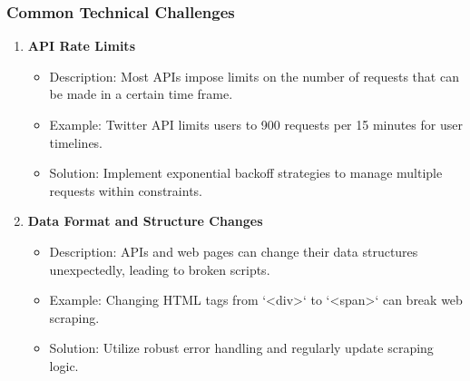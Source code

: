\documentclass{beamer}
\begin{document}
\begin{frame}[fragile]
    \frametitle{Common Technical Challenges}
    \begin{enumerate}
        \item \textbf{API Rate Limits}
        \begin{itemize}
            \item Description: Most APIs impose limits on the number of requests that can be made in a certain time frame.
            \item Example: Twitter API limits users to 900 requests per 15 minutes for user timelines.
            \item Solution: Implement exponential backoff strategies to manage multiple requests within constraints.
        \end{itemize}
        
        \item \textbf{Data Format and Structure Changes}
        \begin{itemize}
            \item Description: APIs and web pages can change their data structures unexpectedly, leading to broken scripts.
            \item Example: Changing HTML tags from `<div>` to `<span>` can break web scraping.
            \item Solution: Utilize robust error handling and regularly update scraping logic.
        \end{itemize}
    \end{enumerate}
\end{frame}
\end{document}
